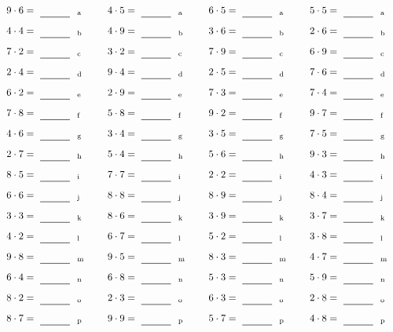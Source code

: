 \documentclass
[
  draft    = true,
  fontsize = 11pt,
  parskip  = half-
]
{scrartcl}
\begin{document}
\par\vfill\par
\begin{align*}
    \pline{9\cdot6}&=\rline{a}
  & \pline{4\cdot5}&=\rline{a}
  & \pline{6\cdot5}&=\rline{a}
  & \pline{5\cdot5}&=\rline{a} \\[1ex]
    \pline{4\cdot4}&=\rline{b}
  & \pline{4\cdot9}&=\rline{b}
  & \pline{3\cdot6}&=\rline{b}
  & \pline{2\cdot6}&=\rline{b} \\[1ex]
    \pline{7\cdot2}&=\rline{c}
  & \pline{3\cdot2}&=\rline{c}
  & \pline{7\cdot9}&=\rline{c}
  & \pline{6\cdot9}&=\rline{c} \\[1ex]
    \pline{2\cdot4}&=\rline{d}
  & \pline{9\cdot4}&=\rline{d}
  & \pline{2\cdot5}&=\rline{d}
  & \pline{7\cdot6}&=\rline{d} \\[1ex]
    \pline{6\cdot2}&=\rline{e}
  & \pline{2\cdot9}&=\rline{e}
  & \pline{7\cdot3}&=\rline{e}
  & \pline{7\cdot4}&=\rline{e} \\[1ex]
    \pline{7\cdot8}&=\rline{f}
  & \pline{5\cdot8}&=\rline{f}
  & \pline{9\cdot2}&=\rline{f}
  & \pline{9\cdot7}&=\rline{f} \\[1ex]
    \pline{4\cdot6}&=\rline{g}
  & \pline{3\cdot4}&=\rline{g}
  & \pline{3\cdot5}&=\rline{g}
  & \pline{7\cdot5}&=\rline{g} \\[1ex]
    \pline{2\cdot7}&=\rline{h}
  & \pline{5\cdot4}&=\rline{h}
  & \pline{5\cdot6}&=\rline{h}
  & \pline{9\cdot3}&=\rline{h} \\[1ex]
    \pline{8\cdot5}&=\rline{i}
  & \pline{7\cdot7}&=\rline{i}
  & \pline{2\cdot2}&=\rline{i}
  & \pline{4\cdot3}&=\rline{i} \\[1ex]
    \pline{6\cdot6}&=\rline{j}
  & \pline{8\cdot8}&=\rline{j}
  & \pline{8\cdot9}&=\rline{j}
  & \pline{8\cdot4}&=\rline{j} \\[1ex]
    \pline{3\cdot3}&=\rline{k}
  & \pline{8\cdot6}&=\rline{k}
  & \pline{3\cdot9}&=\rline{k}
  & \pline{3\cdot7}&=\rline{k} \\[1ex]
    \pline{4\cdot2}&=\rline{l}
  & \pline{6\cdot7}&=\rline{l}
  & \pline{5\cdot2}&=\rline{l}
  & \pline{3\cdot8}&=\rline{l} \\[1ex]
    \pline{9\cdot8}&=\rline{m}
  & \pline{9\cdot5}&=\rline{m}
  & \pline{8\cdot3}&=\rline{m}
  & \pline{4\cdot7}&=\rline{m} \\[1ex]
    \pline{6\cdot4}&=\rline{n}
  & \pline{6\cdot8}&=\rline{n}
  & \pline{5\cdot3}&=\rline{n}
  & \pline{5\cdot9}&=\rline{n} \\[1ex]
    \pline{8\cdot2}&=\rline{o}
  & \pline{2\cdot3}&=\rline{o}
  & \pline{6\cdot3}&=\rline{o}
  & \pline{2\cdot8}&=\rline{o} \\[1ex]
    \pline{8\cdot7}&=\rline{p}
  & \pline{9\cdot9}&=\rline{p}
  & \pline{5\cdot7}&=\rline{p}
  & \pline{4\cdot8}&=\rline{p}
\end{align*}
\end{document}

